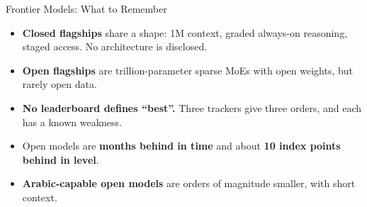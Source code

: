 \begin{frame}{Frontier Models: What to Remember}
    \begin{itemize}\itemsep0.55em
        \item \textbf{Closed flagships} share a shape: 1M context, graded always-on reasoning, staged access. No architecture is disclosed.
        \item \textbf{Open flagships} are trillion-parameter sparse MoEs with open weights, but rarely open data.
        \item \textbf{No leaderboard defines ``best''.} Three trackers give three orders, and each has a known weakness.
        \item Open models are \textbf{months behind in time} and about \textbf{10 index points behind in level}.
        \item \textbf{Arabic-capable open models} are orders of magnitude smaller, with short context.
    \end{itemize}
    \vspace{0.4em}
\end{frame}
